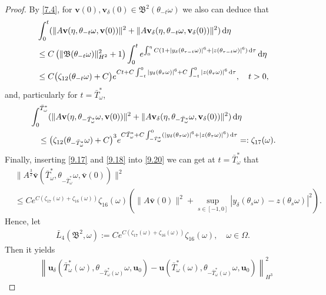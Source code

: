 \documentclass{elsarticle}
\theoremstyle{definition}
\numberwithin{equation}{section}
\renewcommand{\d}{{\rm{d}}}
\begin{document}
\begin{proof}
By \eqref{7.4}, for   $\textbf{v}(0), \textbf{v}_\delta(0) \in \mathfrak B^2(\theta_{-t}\omega)$ we also can deduce that
 \begin{align*}
 &\int_0^t
 (\|A \textbf{v}(\eta, \theta_{-t} \omega, \textbf{v}(0))\|^2+\|A \textbf{v}_\delta(\eta, \theta_{-t} \omega, \textbf{v}_\delta(0))\|^2) \, \d \eta\nonumber\\
 &   \leq  C\left( \| \mathfrak B  (\theta_{-t}\omega)\|_{H^2}^2 +1 \right) \int_0^t e^{ \int^\eta_0 C(1+|y_\delta(\theta_{\tau-t} \omega)|^6+|z(\theta_{\tau-t} \omega)|^6) \, \d \tau}  \, \d \eta \nonumber \\
 &   \leq  C\big( \zeta_{12}(\theta_{-t}\omega)  +C \big)  e^{ Ct+C \int^0_{-t}  |y_\delta(\theta_{\tau} \omega)|^6+C \int^0_{-t}  |z(\theta_{\tau} \omega)|^6 \, \d \tau}   ,
   \quad t>0  , \nonumber
\end{align*}
and, particularly for $t=\bar{T}_\omega^*$,
 \begin{align}\label{9.18}
 & \int_0^{\bar{T}_\omega^*}
 (\|A \textbf{v}(\eta, \theta_{-{\bar{T}_\omega^*}} \omega, \textbf{v}(0))\|^2+ \|A \textbf{v}_\delta(\eta, \theta_{-{\bar{T}_\omega^*}} \omega, \textbf{v}_\delta(0))\|^2)\, \d \eta \nonumber \\
 &   \quad  \leq  \big( \zeta_{12}(\theta_{-{\bar{T}_\omega^*}}\omega)  +C \big)^3  e^{ C {\bar{T}_\omega^*}+C \int^0_{-{\bar{T}_\omega^*}} ( |y_\delta(\theta_{\tau} \omega)|^6+ |z(\theta_{\tau} \omega)|^6)\, \d \tau} =:\zeta_{17}(\omega).
\end{align}
Finally, inserting     \eqref{9.17}  and \eqref{9.18}  into \eqref{9.20}  we can get at $t=\bar{T}_\omega^*$ that
\begin{align}
 &\|A^\frac32\bar{\textbf{v}}(\bar{T}_\omega^* ,\theta_{-\bar{T}_\omega^* }\omega,\bar{\textbf{v}}(0))\|^2\nonumber\\
&\leq Ce^{  C (\zeta_{17}(\omega)+\zeta_{16}(\omega)) } \zeta_{16}(\omega)
\left(\|A\bar{\textbf{v}}(0)\|^2+\sup\limits_{s\in[-1,0]}|y_\delta(\theta_s\omega)-z(\theta_s\omega)|^2\right).
\end{align}
Hence, let
\begin{align*}
 \bar{L}_4 (\mathfrak B^2, \omega) :=   Ce^{ C (\zeta_{17}(\omega)+\zeta_{16}(\omega)) } \zeta_{16}(\omega) ,\quad \omega\in \Omega.
\end{align*}
Then it yields
\begin{align*}
&\left \| \textbf{u}_\delta \! \left ( \bar{T}_\omega^* (\omega) ,\theta_{-\bar{T}_\omega^*(\omega)}\omega,  \textbf{u}_{0}\right)
 - \textbf{u} \! \left ( \bar{T}_\omega^* (\omega) ,\theta_{-\bar{T}_\omega^*(\omega)}\omega, \textbf{u}_{0}\right) \right \|^2_{H^3}

\end{align*}
\end{proof}
\end{document}
